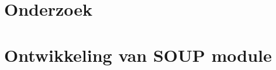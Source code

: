     \part{Onderzoek}\label{prt:Onderzoek}
    
    
    
    
    
    
    

    \ctparttext{}
    \part{Ontwikkeling van SOUP module}\label{prt:Implementatie}
    
    
    
%    
%    
%    
%    
%    
%
%    
%    

    \cleardoublepage %


%    
%    
%    
%    
%    
%    

